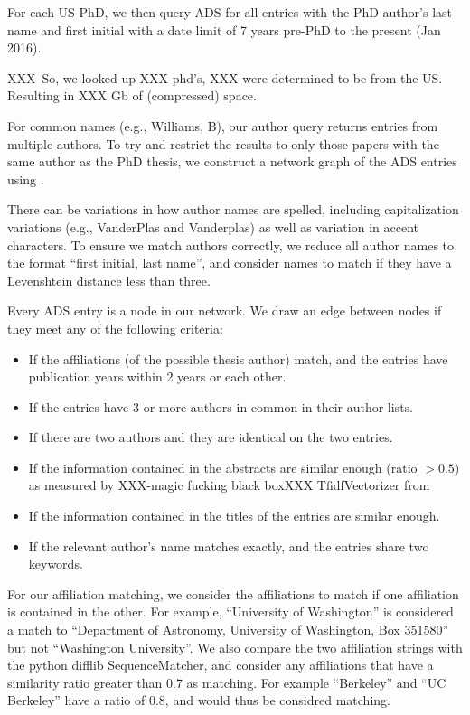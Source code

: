 \documentclass{emulateapj}
\begin{document}
For each US PhD, we then query ADS for all entries with the PhD author's last name and first initial with a date limit of 7 years pre-PhD to the present (Jan 2016).

XXX--So, we looked up XXX phd's, XXX were determined to be from the US. Resulting in XXX Gb of (compressed) space.  

For common names (e.g.,  Williams, B), our author query returns entries from multiple authors.  To try and restrict the results to only those papers with the same author as the PhD thesis, we construct a network graph of the ADS entries using \citet{networkx}.

There can be variations in how author names are spelled, including capitalization variations (e.g., \mbox{VanderPlas} and Vanderplas) as well as variation in accent characters.  To ensure we match authors correctly, we reduce all author names to the format ``first initial, last name'', and consider names to match if they have a Levenshtein distance less than three.

Every ADS entry is a node in our network. We draw an edge between nodes if they meet any of the following criteria:

\begin{itemize}
\item{If the affiliations (of the possible thesis author) match, and the entries have publication years within 2 years or each other.}
\item{If the entries have 3 or more authors in common in their author lists.}
\item{If there are two authors and they are identical on the two entries.}
\item{If the information contained in the abstracts are similar enough (ratio $> 0.5$) as measured by XXX-magic fucking black boxXXX TfidfVectorizer from \citet{scikit-learn}}
\item{If the information contained in the titles of the entries are similar enough.}
  \item{If the relevant author's name matches exactly, and the entries share two keywords.}
\end{itemize}

For our affiliation matching, we consider the affiliations to match if one affiliation is contained in the other.  For example, ``University of Washington'' is considered a match to ``Department of Astronomy, University of Washington, Box 351580'' but not ``Washington University''.  We also compare the two affiliation strings with the python difflib SequenceMatcher, and consider any affiliations that have a similarity ratio greater than 0.7 as matching.  For example ``Berkeley'' and ``UC Berkeley'' have a ratio of 0.8, and would thus be considred matching.
\end{document}
